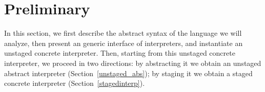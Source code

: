 \newcommand{\TLang}{$L_\lambda$}

\section{Preliminary}

In this section, we first describe the abstract syntax of the language we will analyze, then present an 
generic interface of interpreters, and instantiate an unstaged concrete interpreter.
Then, starting from this unstaged concrete interpreter, we proceed in two directions:
by abstracting it we obtain an unstaged abstract interpreter (Section~\ref{unstaged_abs}); 
by staging it we obtain a staged concrete interpreter (Section~\ref{stagedinterp}).




